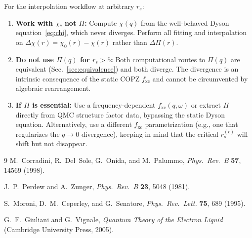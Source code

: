 \documentclass[aps,prb,twocolumn,superscriptaddress,floatfix]{revtex4-2}
\begin{document}
For the interpolation workflow at arbitrary $r_s$:
\begin{enumerate}
    \item \textbf{Work with $\chi$, not $\Pi$:} Compute $\chi(q)$ from the
          well-behaved Dyson equation~\eqref{eq:chi}, which never diverges.
          Perform all fitting and interpolation on
          $\Delta\chi(r) = \chi_0(r) - \chi(r)$ rather than
          $\Delta\Pi(r)$.

    \item \textbf{Do not use $\Pi(q)$ for $r_s > 5$:} Both computational
          routes to $\Pi(q)$ are equivalent (Sec.~\ref{sec:equivalence})
          and both diverge.  The divergence is an intrinsic consequence of
          the static COPZ $f_{\mathrm{xc}}$ and cannot be circumvented by
          algebraic rearrangement.

    \item \textbf{If $\Pi$ is essential:} Use a frequency-dependent
          $f_{\mathrm{xc}}(q,\omega)$ or extract $\Pi$ directly from
          QMC structure factor data, bypassing the static Dyson equation.
          Alternatively, use a different $f_{\mathrm{xc}}$ parametrization
          (e.g., one that regularizes the $q \to 0$ divergence), keeping
          in mind that the critical $r_s^{(c)}$ will shift but not disappear.
\end{enumerate}

\begin{thebibliography}{9}
    M.~Corradini, R.~Del~Sole, G.~Onida, and M.~Palummo,
    \emph{Phys.\ Rev.\ B} \textbf{57}, 14569 (1998).

    J.~P.~Perdew and A.~Zunger,
    \emph{Phys.\ Rev.\ B} \textbf{23}, 5048 (1981).

    S.~Moroni, D.~M.~Ceperley, and G.~Senatore,
    \emph{Phys.\ Rev.\ Lett.} \textbf{75}, 689 (1995).

    G.~F.~Giuliani and G.~Vignale,
    \emph{Quantum Theory of the Electron Liquid}
    (Cambridge University Press, 2005).
\end{thebibliography}
\end{document}
